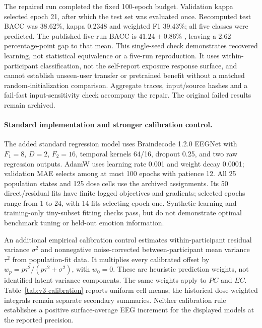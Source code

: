 The repaired run completed the fixed 100-epoch budget. Validation kappa selected
epoch 21, after which the test set was evaluated once. Recomputed test BACC was
38.62\%, kappa 0.2348 and weighted F1 39.43\%; all five classes were predicted.
The published five-run BACC is $41.24\pm0.86\%$ \citep{chen2026emod}, leaving
a 2.62 percentage-point gap to that mean. This single-seed check demonstrates
recovered learning, not statistical equivalence or a five-run reproduction.
It uses within-participant classification, not the self-report exposure
response surface, and cannot establish unseen-user transfer or pretrained
benefit without a matched random-initialization comparison. Aggregate traces,
input/source hashes and a fail-fast input-sensitivity check accompany the
repair. The original failed results remain archived.

\paragraph{Standard implementation and stronger calibration control.}
The added standard regression model uses Braindecode 1.2.0 EEGNet with
$F_1=8$, $D=2$, $F_2=16$, temporal kernels 64/16, dropout 0.25, and two raw
regression outputs. AdamW uses learning rate 0.001 and weight decay 0.0001;
validation MAE selects among at most 100 epochs with patience 12. All 25
population states and 125 dose cells use the archived assignments. Its 50
direct/residual fits have finite logged objectives and gradients; selected
epochs range from 1 to 24, with 14 fits selecting epoch one. Synthetic learning
and training-only tiny-subset fitting checks pass, but do not demonstrate
optimal benchmark tuning or held-out emotion information.

An additional empirical calibration control estimates within-participant
residual variance $\sigma^2$ and nonnegative noise-corrected between-participant
mean variance $\tau^2$ from population-fit data. It multiplies every calibrated
offset by $w_p=p\tau^2/(p\tau^2+\sigma^2)$, with $w_0=0$. These are heuristic
prediction weights, not identified latent variance components. The same weights
apply to $PC$ and $EC$. Table~\ref{tab:v3-calibration} reports uniform cell means;
the historical dose-weighted integrals remain separate secondary summaries.
Neither calibration rule establishes a positive surface-average EEG increment
for the displayed models at the reported precision.

